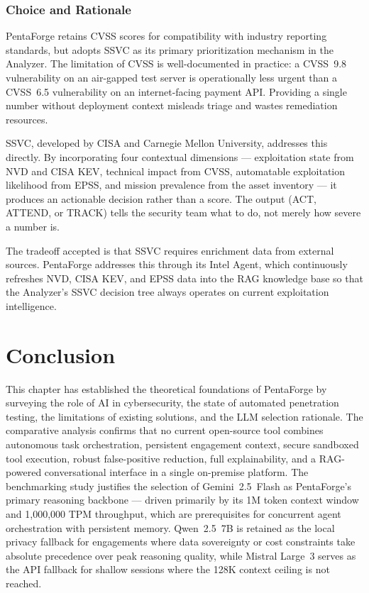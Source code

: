 \documentclass[12pt,a4paper]{report}
\begin{document}
\subsubsection{Choice and Rationale}

PentaForge retains CVSS scores for compatibility with industry reporting
standards, but adopts SSVC as its primary prioritization mechanism in the
Analyzer. The limitation of CVSS is well-documented in practice: a
CVSS~9.8 vulnerability on an air-gapped test server is operationally less
urgent than a CVSS~6.5 vulnerability on an internet-facing payment API.
Providing a single number without deployment context misleads triage and
wastes remediation resources.

SSVC, developed by CISA and Carnegie Mellon University, addresses this
directly. By incorporating four contextual dimensions --- exploitation
state from NVD and CISA KEV, technical impact from CVSS, automatable
exploitation likelihood from EPSS, and mission prevalence from the asset
inventory --- it produces an actionable decision rather than a score.
The output (ACT, ATTEND, or TRACK) tells the security team what to do,
not merely how severe a number is.

The tradeoff accepted is that SSVC requires enrichment data from external
sources. PentaForge addresses this through its Intel Agent, which
continuously refreshes NVD, CISA KEV, and EPSS data into the RAG knowledge
base so that the Analyzer's SSVC decision tree always operates on current
exploitation intelligence.

\section{Conclusion}

This chapter has established the theoretical foundations of PentaForge by surveying
the role of AI in cybersecurity, the state of automated penetration testing, the
limitations of existing solutions, and the LLM selection rationale. The comparative
analysis confirms that no current open-source tool combines autonomous task
orchestration, persistent engagement context, secure sandboxed tool execution,
robust false-positive reduction, full explainability, and a RAG-powered
conversational interface in a single on-premise platform. The benchmarking study
justifies the selection of Gemini~2.5~Flash as PentaForge's primary reasoning
backbone --- driven primarily by its 1M token context window and 1{,}000{,}000
TPM throughput, which are prerequisites for concurrent agent orchestration with
persistent memory. Qwen~2.5~7B is retained as the local privacy fallback for engagements
where data sovereignty or cost constraints take absolute precedence over
peak reasoning quality, while Mistral Large~3 serves as the API fallback
for shallow sessions where the 128K context ceiling is not reached.
\end{document}
